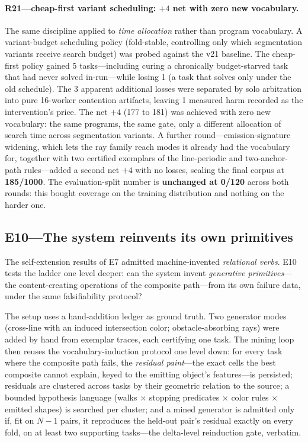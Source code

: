 \documentclass[11pt]{article}
\begin{document}
\paragraph{R21---cheap-first variant scheduling: $+4$ net with zero new
vocabulary.}
The same discipline applied to \emph{time allocation} rather than program
vocabulary.  A variant-budget scheduling policy (fold-stable, controlling
only which segmentation variants receive search budget) was probed against
the v21 baseline.  The cheap-first policy gained 5 tasks---including curing
a chronically budget-starved task that had never solved
in-run---while losing 1 (a task that solves only under the old schedule).
The 3 apparent additional losses were separated by solo arbitration into
pure 16-worker contention artifacts, leaving 1 measured harm recorded as the
intervention's price.  The net $+4$ (177 to 181) was achieved with zero new
vocabulary: the same programs, the same gate, only a different allocation of
search time across segmentation variants.  A further round---emission-signature
widening, which lets the ray family reach modes it already had the vocabulary
for, together with two certified exemplars of the line-periodic and
two-anchor-path rules---added a second net $+4$ with no losses, sealing the
final corpus at \textbf{185/1000}.
The evaluation-split number is \textbf{unchanged at 0/120} across both
rounds: this bought coverage on the training distribution and nothing on the
harder one.

\subsection{E10---The system reinvents its own primitives}

The self-extension results of E7 admitted machine-invented \emph{relational
verbs}.  E10 tests the ladder one level deeper: can the system invent
\emph{generative primitives}---the content-creating operations of the
composite path---from its own failure data, under the same falsifiability
protocol?

The setup uses a hand-addition ledger as ground truth.  Two generator modes
(cross-line with an induced intersection color; obstacle-absorbing rays)
were added by hand from exemplar traces, each certifying one task.  The
mining loop then reuses the vocabulary-induction protocol one level down:
for every task where the composite path fails, the \emph{residual
paint}---the exact cells the best composite cannot explain, keyed to the
emitting object's features---is persisted; residuals are clustered across
tasks by their geometric relation to the source; a bounded hypothesis
language (walks $\times$ stopping predicates $\times$ color rules $\times$
emitted shapes) is searched per cluster; and a mined generator is admitted
only if, fit on $N{-}1$ pairs, it reproduces the held-out pair's residual
exactly on every fold, on at least two supporting tasks---the delta-level
reinduction gate, verbatim.
\end{document}
